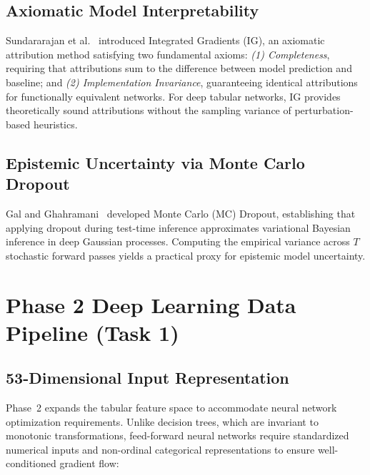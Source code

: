 \documentclass[conference]{IEEEtran}
\begin{document}
\subsection{Axiomatic Model Interpretability}
Sundararajan et al.~\cite{sundararajan2017axiomatic} introduced Integrated Gradients (IG),
an axiomatic attribution method satisfying two fundamental axioms:
\emph{(1) Completeness}, requiring that attributions sum to the difference between model
prediction and baseline; and \emph{(2) Implementation Invariance}, guaranteeing identical
attributions for functionally equivalent networks. For deep tabular networks, IG provides
theoretically sound attributions without the sampling variance of perturbation-based heuristics.

\subsection{Epistemic Uncertainty via Monte Carlo Dropout}
Gal and Ghahramani~\cite{gal2016dropout} developed Monte Carlo (MC) Dropout, establishing
that applying dropout during test-time inference approximates variational Bayesian inference
in deep Gaussian processes. Computing the empirical variance across $T$ stochastic forward
passes yields a practical proxy for epistemic model uncertainty.

\section{Phase 2 Deep Learning Data Pipeline (Task 1)}
\label{sec:pipeline}

\subsection{53-Dimensional Input Representation}
Phase~2 expands the tabular feature space to accommodate neural network optimization
requirements. Unlike decision trees, which are invariant to monotonic transformations,
feed-forward neural networks require standardized numerical inputs and non-ordinal
categorical representations to ensure well-conditioned gradient flow:
\end{document}
